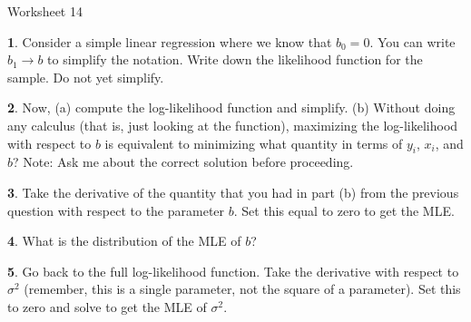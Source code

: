 \documentclass{tufte-handout}
\begin{document}
\justify

{\LARGE Worksheet 14}

\vspace*{18pt}


\textbf{1}. Consider a simple linear regression where we know that $b_0 = 0$. You can write
$b_1 \rightarrow b$ to simplify the notation. Write down the likelihood function
for the sample. Do not yet simplify.

\textbf{2}. Now, (a) compute the log-likelihood function and simplify. (b) Without doing any
calculus (that is, just looking at the function), maximizing the log-likelihood
with respect to $b$ is equivalent to minimizing what quantity in terms of $y_i$,
$x_i$, and $b$? Note: Ask me about the correct solution before proceeding. 

\textbf{3}. Take the derivative of the quantity that you had in part (b) from the previous
question with respect to the parameter $b$. Set this equal to zero to get the 
MLE.

\textbf{4}. What is the distribution of the MLE of $b$?

\textbf{5}. Go back to the full log-likelihood function. Take the derivative with respect
to $\sigma^2$ (remember, this is a single parameter, not the square of a parameter).
Set this to zero and solve to get the MLE of $\sigma^2$.
\end{document}
